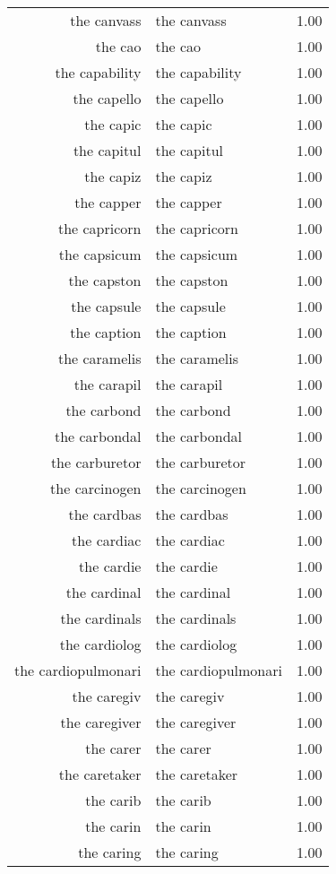 \begin{table}[ht]
\begin{tabular}{rlr}
  the canvass & the canvass & 1.00 \\ 
  the cao & the cao & 1.00 \\ 
  the capability & the capability & 1.00 \\ 
  the capello & the capello & 1.00 \\ 
  the capic & the capic & 1.00 \\ 
  the capitul & the capitul & 1.00 \\ 
  the capiz & the capiz & 1.00 \\ 
  the capper & the capper & 1.00 \\ 
  the capricorn & the capricorn & 1.00 \\ 
  the capsicum & the capsicum & 1.00 \\ 
  the capston & the capston & 1.00 \\ 
  the capsule & the capsule & 1.00 \\ 
  the caption & the caption & 1.00 \\ 
  the caramelis & the caramelis & 1.00 \\ 
  the carapil & the carapil & 1.00 \\ 
  the carbond & the carbond & 1.00 \\ 
  the carbondal & the carbondal & 1.00 \\ 
  the carburetor & the carburetor & 1.00 \\ 
  the carcinogen & the carcinogen & 1.00 \\ 
  the cardbas & the cardbas & 1.00 \\ 
  the cardiac & the cardiac & 1.00 \\ 
  the cardie & the cardie & 1.00 \\ 
  the cardinal & the cardinal & 1.00 \\ 
  the cardinals & the cardinals & 1.00 \\ 
  the cardiolog & the cardiolog & 1.00 \\ 
  the cardiopulmonari & the cardiopulmonari & 1.00 \\ 
  the caregiv & the caregiv & 1.00 \\ 
  the caregiver & the caregiver & 1.00 \\ 
  the carer & the carer & 1.00 \\ 
  the caretaker & the caretaker & 1.00 \\ 
  the carib & the carib & 1.00 \\ 
  the carin & the carin & 1.00 \\ 
  the caring & the caring & 1.00 \\ 

\end{tabular}
\end{table}
